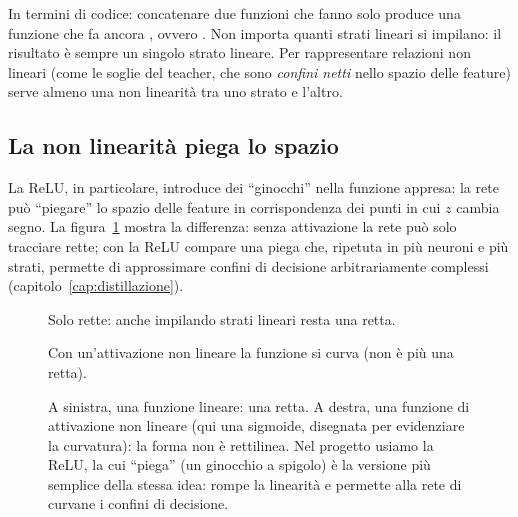 In termini di codice: concatenare due funzioni che fanno solo
 produce una funzione che fa ancora
, ovvero
. Non importa quanti strati lineari si
impilano: il risultato è sempre un singolo strato lineare. Per rappresentare
relazioni non lineari (come le soglie del teacher, che sono \emph{confini
netti} nello spazio delle feature) serve almeno una non linearità tra uno
strato e l'altro.

\subsection{La non linearità piega lo spazio}\label{sec:nonlinear-relu}

La ReLU, in particolare, introduce dei ``ginocchi'' nella funzione appresa:
la rete può ``piegare'' lo spazio delle feature in corrispondenza dei punti
in cui $z$ cambia segno. La figura~\ref{fig:linearita-attivazione} mostra la
differenza: senza attivazione la rete può solo tracciare rette; con la ReLU
compare una piega che, ripetuta in più neuroni e più strati, permette di
approssimare confini di decisione arbitrariamente complessi
(capitolo~\ref{cap:distillazione}).

\begin{figure}[htbp]
  \centering
  \begin{minipage}{0.47\textwidth}
    \centering
    \par\small Solo rette: anche impilando strati lineari resta una retta.
  \end{minipage}
  \hfill
  \begin{minipage}{0.47\textwidth}
    \centering
    \par\small Con un'attivazione non lineare la funzione si curva (non è più una retta).
  \end{minipage}
  \caption{A sinistra, una funzione lineare: una retta. A destra, una
  funzione di attivazione non lineare (qui una sigmoide, disegnata per
  evidenziare la curvatura): la forma non è rettilinea. Nel progetto usiamo
  la ReLU, la cui ``piega'' (un ginocchio a spigolo) è la versione più
  semplice della stessa idea: rompe la linearità e permette alla rete di
  curvane i confini di decisione.}
  \label{fig:linearita-attivazione}
\end{figure}

